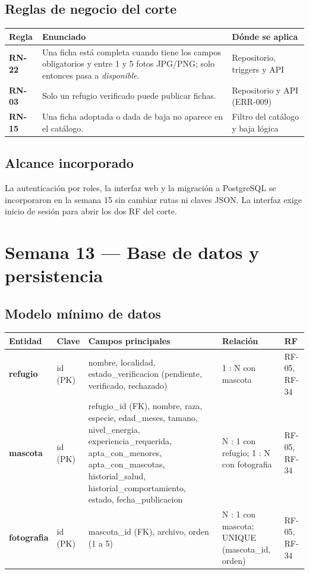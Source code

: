 \documentclass[11pt,a4paper]{article}
\newcommand{\thead}[1]{\textbf{#1}}
\begin{document}
\subsection{Reglas de negocio del corte}

{\footnotesize
\begin{tabularx}{\linewidth}{@{}V{0.4}V{1.7}V{0.9}@{}}
\toprule
\thead{Regla} & \thead{Enunciado} & \thead{Dónde se aplica} \\ \midrule
\textbf{RN-22} & Una ficha está completa cuando tiene los campos obligatorios y
entre 1 y 5 fotos JPG/PNG; solo entonces pasa a \emph{disponible}. &
Repositorio, triggers y API \\
\textbf{RN-03} & Solo un refugio verificado puede publicar fichas. &
Repositorio y API (ERR-009) \\
\textbf{RN-15} & Una ficha adoptada o dada de baja no aparece en el catálogo. &
Filtro del catálogo y baja lógica \\
\bottomrule
\end{tabularx}
}

\subsection{Alcance incorporado}

La autenticación por roles, la interfaz web y la migración a PostgreSQL se
incorporaron en la semana 15 sin cambiar rutas ni claves JSON. La interfaz
exige inicio de sesión para abrir los dos RF del corte.

\clearpage

\section{Semana 13 --- Base de datos y persistencia}

\subsection{Modelo mínimo de datos}

{\footnotesize
\begin{tabularx}{\linewidth}{@{}V{0.55}V{0.55}V{1.95}V{1.0}V{0.95}@{}}
\toprule
\thead{Entidad} & \thead{Clave} & \thead{Campos principales} & \thead{Relación} & \thead{RF} \\ \midrule
\textbf{refugio} & id (PK) & nombre, localidad, estado\_verificacion
(pendiente, verificado, rechazado) & 1 : N con mascota & RF-05, RF-34 \\
\textbf{mascota} & id (PK) & refugio\_id (FK), nombre, raza, especie,
edad\_meses, tamano, nivel\_energia, experiencia\_requerida,
apta\_con\_menores, apta\_con\_mascotas, historial\_salud,
historial\_comportamiento, estado, fecha\_publicacion &
N : 1 con refugio; 1 : N con fotografia & RF-05, RF-34 \\
\textbf{fotografia} & id (PK) & mascota\_id (FK), archivo, orden (1 a 5) &
N : 1 con mascota; UNIQUE (mascota\_id, orden) & RF-05, RF-34 \\
\bottomrule
\end{tabularx}
}
\end{document}

